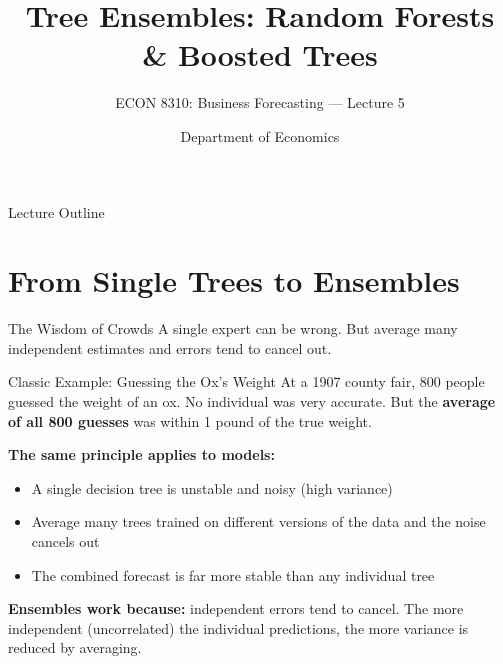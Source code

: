 \documentclass[aspectratio=169, 11pt]{beamer}
\title[Tree Ensembles]{Tree Ensembles: Random Forests \& Boosted Trees}
\subtitle{ECON 8310: Business Forecasting --- Lecture 5}
\author{Department of Economics}
\institute{University of Nebraska at Omaha}
\begin{document}

\begin{frame}
  \titlepage
\end{frame}

\begin{frame}{Lecture Outline}
  \tableofcontents
\end{frame}

\section{From Single Trees to Ensembles}


\begin{frame}{The Wisdom of Crowds}
  A single expert can be wrong. But average many independent estimates
  and errors tend to cancel out.
  \begin{examplebox}{Classic Example: Guessing the Ox's Weight}
    At a 1907 county fair, 800 people guessed the weight of an ox.
    No individual was very accurate. But the \textbf{average of all 800 guesses}
    was within 1 pound of the true weight.
  \end{examplebox}
  \vspace{0.2cm}
  \textbf{The same principle applies to models:}
  \begin{itemize}
    \item A single decision tree is unstable and noisy (high variance)
    \item Average many trees trained on different versions of the data
          and the noise cancels out
    \item The combined forecast is far more stable than any individual tree
  \end{itemize}
  \begin{keybox}
    \textbf{Ensembles work because:} independent errors tend to cancel.
    The more independent (uncorrelated) the individual predictions,
    the more variance is reduced by averaging.
  \end{keybox}
\end{frame}
\end{document}

